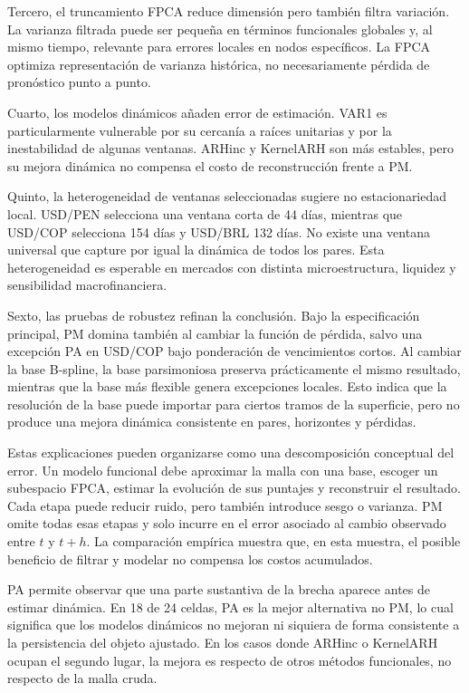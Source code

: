 \documentclass[a4paper,11pt]{article}
\begin{document}
Tercero, el truncamiento FPCA reduce dimensión pero también filtra variación. La varianza filtrada puede ser pequeña en términos funcionales globales y, al mismo tiempo, relevante para errores locales en nodos específicos. La FPCA optimiza representación de varianza histórica, no necesariamente pérdida de pronóstico punto a punto.

Cuarto, los modelos dinámicos añaden error de estimación. VAR1 es particularmente vulnerable por su cercanía a raíces unitarias y por la inestabilidad de algunas ventanas. ARHinc y KernelARH son más estables, pero su mejora dinámica no compensa el costo de reconstrucción frente a PM.

Quinto, la heterogeneidad de ventanas seleccionadas sugiere no estacionariedad local. USD/PEN selecciona una ventana corta de 44 días, mientras que USD/COP selecciona 154 días y USD/BRL 132 días. No existe una ventana universal que capture por igual la dinámica de todos los pares. Esta heterogeneidad es esperable en mercados con distinta microestructura, liquidez y sensibilidad macrofinanciera.

Sexto, las pruebas de robustez refinan la conclusión. Bajo la especificación principal, PM domina también al cambiar la función de pérdida, salvo una excepción PA en USD/COP bajo ponderación de vencimientos cortos. Al cambiar la base B-spline, la base parsimoniosa preserva prácticamente el mismo resultado, mientras que la base más flexible genera excepciones locales. Esto indica que la resolución de la base puede importar para ciertos tramos de la superficie, pero no produce una mejora dinámica consistente en pares, horizontes y pérdidas.

Estas explicaciones pueden organizarse como una descomposición conceptual del error. Un modelo funcional debe aproximar la malla con una base, escoger un subespacio FPCA, estimar la evolución de sus puntajes y reconstruir el resultado. Cada etapa puede reducir ruido, pero también introduce sesgo o varianza. PM omite todas esas etapas y solo incurre en el error asociado al cambio observado entre \(t\) y \(t+h\). La comparación empírica muestra que, en esta muestra, el posible beneficio de filtrar y modelar no compensa los costos acumulados.

PA permite observar que una parte sustantiva de la brecha aparece antes de estimar dinámica. En 18 de 24 celdas, PA es la mejor alternativa no PM, lo cual significa que los modelos dinámicos no mejoran ni siquiera de forma consistente a la persistencia del objeto ajustado. En los casos donde ARHinc o KernelARH ocupan el segundo lugar, la mejora es respecto de otros métodos funcionales, no respecto de la malla cruda.
\end{document}
